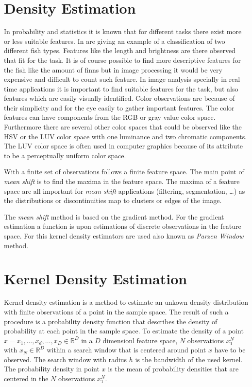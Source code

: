 \section{Density Estimation} %
\label{sec:density_estimation}
In probability and statistics it is known that for different tasks there exist
more or less suitable features. In \citeauthor{citeulike:167581}
\citep{citeulike:167581} are giving an example of a classification of two
different fish types. Features like the length and brightness are there observed
that fit for the task. It is of course possible to find more descriptive
features for the fish like the amount of finns but in image processing it would
be very expensive and difficult to count such feature. In image analysis
specially in real time applications it is important to find suitable features
for the task, but also features which are easily visually identified. Color
observations are because of their simplicity and for the eye easily to gather
important features. The color features can have components from the \gls{RGB} or
gray value color space. Furthermore there are several other color spaces that
could be observed like the \gls{HSV} or the \gls{LUV} color space with one
luminance and two chromatic components. The \gls{LUV} color space is often used
in computer graphics because of its attribute to be a perceptually uniform color
space.

With a finite set of observations follows a finite feature space. The main point
of \emph{mean shift} is to find the maxima in the feature space. The maxima of a
feature space are all important for \emph{mean shift} applications
(filtering, segmentation, \ldots) as the distributions or discontinuities map to
clusters or edges of the image.

The \emph{mean shift} method is based on the gradient method. For the gradient
estimation a function is upon estimations of discrete observations in the
feature space. For this kernel density estimators are used also known as 
\emph{Parzen Window} method.

\section{Kernel Density Estimation} %
\label{sec:kernel_density_estimation}
Kernel density estimation is a method to estimate an unkown density
distribution with finite observations of a point in the sample space. 
The result of such a procedure is a probability density function that describes 
the density of probability at each point in the sample space. To estimate the 
density of a point $x = { x_1, \ldots , x_d, \ldots , x_D} \in \mathbb{R}^D$ in a 
$D$ dimensionl feature space, $N$ observations $x_1^N$ with
 $x_N \in \mathbb{R}^D$ within a search window that is centered around point $x$
have to be observed. The search window with radius $h$ is the bandwidth of the
used kernel. The probability density in point $x$ is the mean of probability 
densities that are centered in the $N$ observations $x_1^N$.

